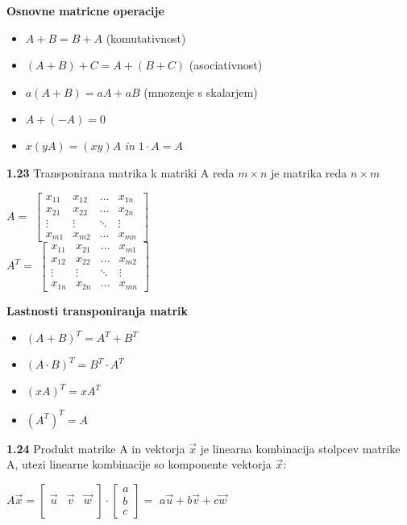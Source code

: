 \documentclass{article}
\begin{document}
\begin{multicols}{3}
\textbf{Osnovne matricne operacije}
\begin{itemize}
    \item $A + B = B + A$ (komutativnost)
    \item $(A + B) + C = A + (B + C)$ (asociativnost)
    \item $a(A + B) = aA + aB$ (mnozenje s skalarjem)
    \item $A + (-A) = 0$
    \item $x(yA) = (xy)A$ \textit{in} $1 \cdot A = A$
\end{itemize}

\textbf{1.23} Transponirana matrika k matriki A reda $m \times n$
je matrika reda $n \times m$
\begin{center}
    $A =$
    $\begin{bmatrix}
        x_{11} & x_{12} & \dots  & x_{1n} \\
        x_{21} & x_{22} & \dots  & x_{2n} \\
        \vdots & \vdots & \ddots & \vdots \\
        x_{m1} & x_{m2} & \dots  & x_{mn}
    \end{bmatrix}$\\
    \smallskip
    $A^{T} =$
    $\begin{bmatrix}
        x_{11} & x_{21} & \dots  & x_{m1} \\
        x_{12} & x_{22} & \dots  & x_{m2} \\
        \vdots & \vdots & \ddots & \vdots \\
        x_{1n} & x_{2n} & \dots  & x_{mn}
    \end{bmatrix}$
\end{center}

\textbf{Lastnosti transponiranja matrik}
\begin{itemize}
    \item $(A + B)^{T} = A^{T} + B^{T}$
    \item $(A \cdot B)^{T} = B^{T} \cdot A^{T}$
    \item $(xA)^{T} = xA^{T}$
    \item $(A^{T})^{T} = A$
\end{itemize}

\textbf{1.24} Produkt matrike A in vektorja $\vec{x}$ je
linearna kombinacija stolpcev matrike A, utezi linearne
kombinacije so komponente vektorja $\vec{x}$:
\begin{center}
    $A \vec{x} =
    \begin{bmatrix}
                &         & \\
        \vec{u} & \vec{v} & \vec{w} \\
                &         & \\
    \end{bmatrix}
    \cdot
    \begin{bmatrix}
        a\\
        b\\
        c
    \end{bmatrix} =$
    $a\vec{u} + b\vec{v} + c\vec{w}$
\end{center}


\end{multicols}
\end{document}
